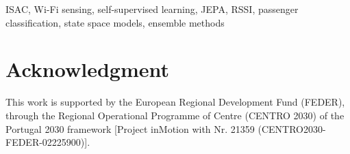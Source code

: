 \documentclass[conference]{IEEEtran}
\begin{document}
\begin{IEEEkeywords}
    ISAC, Wi-Fi sensing, self-supervised learning, JEPA, RSSI, passenger classification, state space models, ensemble methods
\end{IEEEkeywords}







\section*{Acknowledgment}
This work is supported by the European Regional Development Fund (FEDER), through the Regional Operational Programme of Centre (CENTRO 2030) of the Portugal 2030 framework [Project inMotion with Nr. 21359 (CENTRO2030-FEDER-02225900)].



\end{document}

